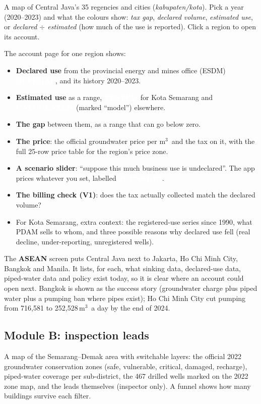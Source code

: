 \documentclass[11pt,a4paper]{article}
\newcommand{\pv}[2]{{\setlength{\fboxsep}{1.3pt}\colorbox{#1}{\textcolor{white}{\sffamily\bfseries\fontsize{6.3}{7}\selectfont #2}}}}
\newcommand{\Off}{\pv{accent}{OFFICIAL}}
\newcommand{\Tst}{\pv{tested}{TESTED}}
\newcommand{\Calc}{\pv{calc}{CALCULATED}}
\newcommand{\Scn}{\pv{scen}{SCENARIO}}
\newcommand{\mthree}{m$^{3}$}
\begin{document}
\begin{tryit}
A map of Central Java's 35 regencies and cities (\emph{kabupaten/kota}). Pick a year (2020--2023) and what
the colours show: \emph{tax gap}, \emph{declared volume}, \emph{estimated use}, or \emph{declared $\div$
estimated} (how much of the use is reported). Click a region to open its account.
\end{tryit}

The account page for one region shows:
\begin{itemize}
\item \textbf{Declared use} from the provincial energy and mines office (ESDM) \Off, and its history
  2020--2023.
\item \textbf{Estimated use} as a range, \Tst\ for Kota Semarang and \Calc\ (marked ``model'') elsewhere.
\item \textbf{The gap} between them, as a range that can go below zero.
\item \textbf{The price}: the official groundwater price per \mthree\ and the tax on it, with the full
  25-row price table for the region's price zone.
\item \textbf{A scenario slider}: ``suppose this much business use is undeclared''. The app prices
  whatever you set, labelled \Scn.
\item \textbf{The billing check (V1)}: does the tax actually collected match the declared volume?
\item For Kota Semarang, extra context: the registered-use series since 1990, what PDAM sells to whom, and
  three possible reasons why declared use fell (real decline, under-reporting, unregistered wells).
\end{itemize}

The \textbf{ASEAN} screen puts Central Java next to Jakarta, Ho Chi Minh City, Bangkok and Manila. It lists,
for each, what sinking data, declared-use data, piped-water data and policy exist today, so it is clear
where an account could open next. Bangkok is shown as the success story (groundwater charge plus piped
water plus a pumping ban where pipes exist); Ho Chi Minh City cut pumping from 716,581 to 252,528\,\mthree\
a day by the end of 2024.

\subsection{Module B: inspection leads}

\begin{tryit}
A map of the Semarang--Demak area with switchable layers: the official 2022 groundwater conservation
zones (safe, vulnerable, critical, damaged, recharge), piped-water coverage per sub-district, the 467
drilled wells marked on the 2022 zone map, and the leads themselves (inspector only). A funnel shows how
many buildings survive each filter.
\end{tryit}
\end{document}
